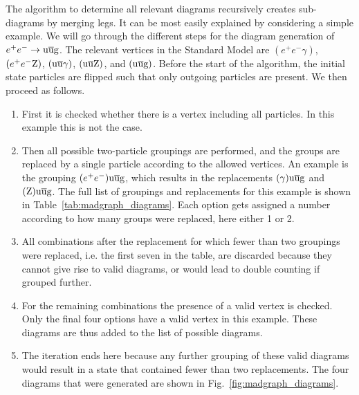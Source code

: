 The algorithm to determine all relevant diagrams recursively creates sub-diagrams by merging legs.
It can be most easily explained by considering a simple example. We will go through the different
steps for the diagram generation of $e^+ e^- \rightarrow \mathrm{u} \overline{\mathrm{u}} \mathrm{g}$. The relevant vertices
in the Standard Model are $(e^+ e^- \gamma)$, $(e^+ e^- \mathrm{Z})$, $(\mathrm{u} \overline{\mathrm{u}} \gamma)$, $(\mathrm{u}
\overline{\mathrm{u}} \mathrm{Z})$, and $(\mathrm{u} \overline{\mathrm{u}} \mathrm{g})$. Before the start of the algorithm, the initial state
particles are flipped such that only outgoing particles are present. We then proceed as follows.
\begin{enumerate}
  \item  First it is checked whether there is a vertex including all particles. In this example
this is not the case. 
  \item Then all possible two-particle groupings are performed, and the groups are replaced by a
single particle according to the allowed vertices. An example is the grouping $(e^+ e^-) \mathrm{u}
\overline{\mathrm{u}} \mathrm{g}$, which results in the replacements $(\gamma) \mathrm{u} \overline{\mathrm{u}} \mathrm{g}$ and $(\mathrm{Z}) \mathrm{u}
\overline{\mathrm{u}} \mathrm{g}$. The full list of groupings and replacements for this example is shown in
Table~\ref{tab:madgraph_diagrams}. Each option gets assigned a number according to how many groups
were replaced, here either 1 or 2. 
  \item All combinations after the replacement for which fewer than two groupings were replaced,
i.e. the first seven in the table, are discarded because they cannot give rise to valid diagrams, or
would lead to double counting if grouped further. 
  \item For the remaining combinations the presence of a valid vertex is checked. Only the final
four options have a valid vertex in this example. These diagrams are thus added to the list of
possible diagrams. 
  \item The iteration ends here because any further grouping of these valid diagrams would result
in a state that contained fewer than two replacements. The four diagrams that were generated are
shown in Fig.~\ref{fig:madgraph_diagrams}.
\end{enumerate}

